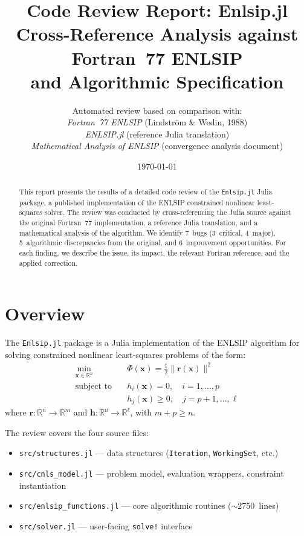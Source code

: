 \documentclass[11pt, a4paper]{article}
\title{%
  \textbf{Code Review Report: Enlsip.jl}\\[8pt]
  \large Cross-Reference Analysis against Fortran~77 ENLSIP\\
  and Algorithmic Specification
}
\author{Automated review based on comparison with:\\[4pt]
  \textit{Fortran~77 ENLSIP} (Lindstr\"om \& Wedin, 1988)\\
  \textit{ENLSIP.jl} (reference Julia translation)\\
  \textit{Mathematical Analysis of ENLSIP} (convergence analysis document)
}
\date{\today}
\begin{document}
\maketitle

\begin{abstract}
This report presents the results of a detailed code review of the
\texttt{Enlsip.jl} Julia package, a published implementation of the
ENLSIP constrained nonlinear least-squares solver.  The review was
conducted by cross-referencing the Julia source against the original
Fortran~77 implementation, a reference Julia translation, and a
mathematical analysis of the algorithm.  We identify 7~bugs (3~critical,
4~major), 5~algorithmic discrepancies from the original, and
6~improvement opportunities.  For each finding, we describe the issue,
its impact, the relevant Fortran reference, and the applied correction.
\end{abstract}

\tableofcontents
\newpage

\section{Overview}

The \texttt{Enlsip.jl} package is a Julia implementation of the ENLSIP
algorithm for solving constrained nonlinear least-squares problems of the
form:
\begin{align}
  \min_{\mathbf{x} \in \mathbb{R}^n} \quad & \Phi(\mathbf{x}) = \tfrac{1}{2}\|\mathbf{r}(\mathbf{x})\|^2 \\
  \text{subject to} \quad & h_i(\mathbf{x}) = 0, \quad i = 1,\dots,p \\
  & h_j(\mathbf{x}) \geq 0, \quad j = p+1,\dots,\ell
\end{align}
where $\mathbf{r} : \mathbb{R}^n \to \mathbb{R}^m$ and
$\mathbf{h} : \mathbb{R}^n \to \mathbb{R}^\ell$, with $m + p \geq n$.

The review covers the four source files:
\begin{itemize}[nosep]
  \item \texttt{src/structures.jl} --- data structures (\texttt{Iteration}, \texttt{WorkingSet}, etc.)
  \item \texttt{src/cnls\_model.jl} --- problem model, evaluation wrappers, constraint instantiation
  \item \texttt{src/enlsip\_functions.jl} --- core algorithmic routines ($\sim$2750~lines)
  \item \texttt{src/solver.jl} --- user-facing \texttt{solve!} interface
\end{itemize}
\end{document}
